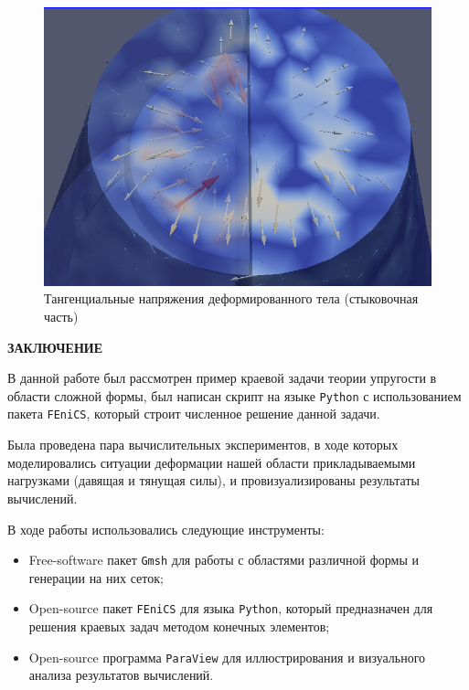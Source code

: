 \documentclass[a4paper, 14pt]{extreport}
\begin{document}
\begin{figure}[H]
	\center
	\includegraphics[scale=0.5]{pictures/result_pull_shear_stress_partial.png}
	\caption{Тангенциальные напряжения деформированного тела (стыковочная часть)}
	\label{fig: result_pull_shear_stress_partial}
\end{figure}

\newpage
{}
\begin{center}
	\Large{\textbf{ЗАКЛЮЧЕНИЕ}}
\end{center}

В данной работе был рассмотрен пример краевой задачи теории
упругости в области сложной формы, был написан скрипт на языке \texttt{Python}
с использованием пакета \texttt{FEniCS}, который строит численное решение данной
задачи. 

Была проведена пара вычислительных экспериментов,
в ходе которых моделировались ситуации деформации нашей области
прикладываемыми нагрузками (давящая и тянущая силы), и провизуализированы
результаты вычислений.

В ходе работы использовались следующие инструменты:
\begin{itemize}
	\item Free-software пакет \texttt{Gmsh} для работы с областями
	различной формы и генерации на них сеток;
	\item Open-source пакет \texttt{FEniCS} для языка \texttt{Python},
	который предназначен для решения краевых задач методом конечных элементов;
	\item Open-source программа \texttt{ParaView} для иллюстрирования и
	визуального анализа результатов вычислений.
\end{itemize}
\end{document}
